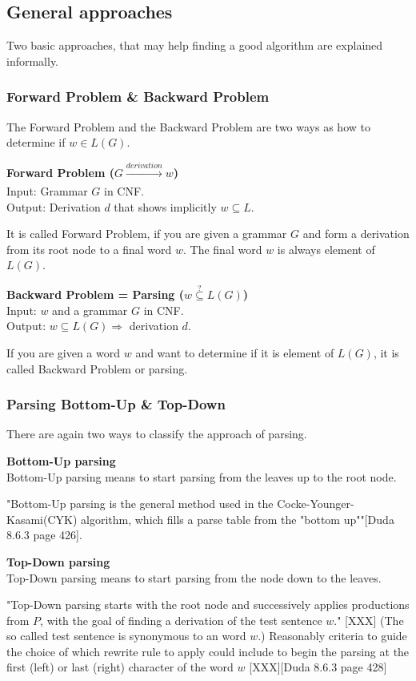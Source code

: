 \subsection{General approaches}
Two basic approaches, that may help finding a good algorithm are explained informally.
\subsubsection{Forward Problem \& Backward Problem}
The Forward Problem and the Backward Problem are two ways as how to determine if $w \in L(G)$.	
\begin{DefGrey}
	\textbf{Forward Problem ($G \xrightarrow[]{derivation} w$)} \\
	Input: Grammar $G$ in CNF. \\
	Output: Derivation $d$ that shows implicitly $w \subseteq L$.
\end{DefGrey}
\noindent It is called Forward Problem, if you are given a grammar $G$ and form a derivation from its root node to a final word $w$. The final word $w$ is always element of $L(G)$.
\begin{DefGrey}
	\textbf{Backward Problem = Parsing ($w\overset{?}{\subseteq}L(G)$)}\\
	Input: $w$ and a grammar $G$ in CNF. \\
	Output: $w \subseteq L(G) \Longrightarrow$ derivation $d$.
\end{DefGrey}
\noindent If you are given a word $w$ and want to determine if it is element of $L(G)$, it is called Backward Problem or parsing.
\subsubsection{Parsing Bottom-Up \& Top-Down}
There are again two ways to classify the approach of parsing.
\begin{DefGrey}
	\textbf{Bottom-Up parsing} \\
	 Bottom-Up parsing means to start parsing from the leaves up to the root node.
\end{DefGrey}
\noindent "Bottom-Up parsing is the general method used in the Cocke-Younger-Kasami(CYK) algorithm, which fills a parse table from the "bottom up""[Duda 8.6.3 page 426].
\begin{DefGrey}
	\textbf{Top-Down parsing} \\
	 Top-Down parsing means to start parsing from the node down to the leaves.
\end{DefGrey}
\noindent "Top-Down parsing starts with the root node and successively applies productions from $P$, with the goal of finding a derivation of the test sentence $w$." [XXX] (The so called test sentence is synonymous to an word $w$.)
Reasonably criteria to guide the choice of which rewrite rule to apply could include to begin the parsing at the first (left) or last (right) character of the word $w$ [XXX][Duda 8.6.3 page 428]

